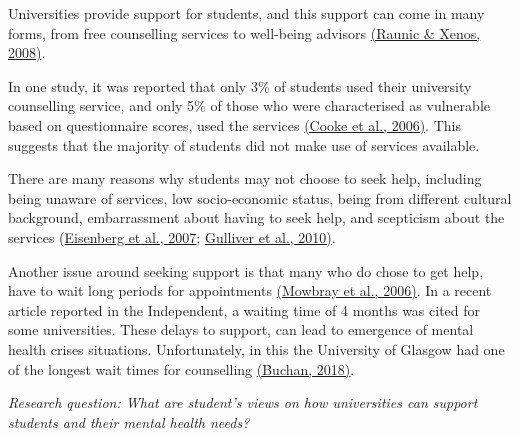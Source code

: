 \documentclass[
  english,
  letterpaper,
  DIV=11,
  numbers=noendperiod]{scrreprt}
\begin{document}
\begin{tcolorbox}[enhanced jigsaw, breakable, bottomtitle=1mm, leftrule=.75mm, opacityback=0, colbacktitle=quarto-callout-note-color!10!white, opacitybacktitle=0.6, toprule=.15mm, colback=white, left=2mm, coltitle=black, bottomrule=.15mm, titlerule=0mm, title={Study overview}, toptitle=1mm, colframe=quarto-callout-note-color-frame, arc=.35mm, rightrule=.15mm]

Universities provide support for students, and this support can come in
many forms, from free counselling services to well-being advisors
\href{https://link.springer.com/article/10.1007/s10447-008-9062-0}{(Raunic
\& Xenos, 2008)}.

In one study, it was reported that only 3\% of students used their
university counselling service, and only 5\% of those who were
characterised as vulnerable based on questionnaire scores, used the
services \href{https://doi.org/10.1080/03069880600942624}{(Cooke et al.,
2006)}. This suggests that the majority of students did not make use of
services available.

There are many reasons why students may not choose to seek help,
including being unaware of services, low socio-economic status, being
from different cultural background, embarrassment about having to seek
help, and scepticism about the services
(\href{https://journals.lww.com/lww-medicalcare/fulltext/2007/07000/help_seeking_and_access_to_mental_health_care_in_a.3.aspx}{Eisenberg
et al., 2007};
\href{https://bmcpsychiatry.biomedcentral.com/articles/10.1186/1471-244X-10-113}{Gulliver
et al., 2010)}.

Another issue around seeking support is that many who do chose to get
help, have to wait long periods for appointments
\href{https://go.exlibris.link/htR5xvWt}{(Mowbray et al., 2006)}. In a
recent article reported in the Independent, a waiting time of 4 months
was cited for some universities. These delays to support, can lead to
emergence of mental health crises situations. Unfortunately, in this the
University of Glasgow had one of the longest wait times for counselling
\href{https://www.independent.co.uk/news/uk/politics/students-mental-health-support-waiting-times-counselling-university-care-diagnosis-treatment-liberal-democrats-norman-lamb-a8124111.html}{(Buchan,
2018)}.

\emph{Research question: What are student's views on how universities
can support students and their mental health needs?}

\end{tcolorbox}
\end{document}
